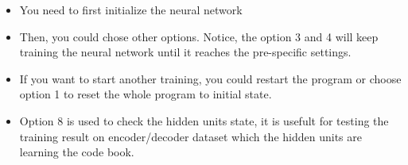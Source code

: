 \documentclass[11pt]{article}
\begin{document}
\begin{itemize}
\item You need to first initialize the neural network
\item Then, you could chose other options. Notice, the option 3 and 4 will keep training the neural network until it reaches the pre-specific settings.
\item If you want to start another training, you could restart the program or choose option 1 to reset the whole program to initial state.
\item Option 8 is used to check the hidden units state, it is usefult for testing the training result on encoder/decoder dataset which the hidden units are learning the code book.
\end{itemize}
\end{document}

